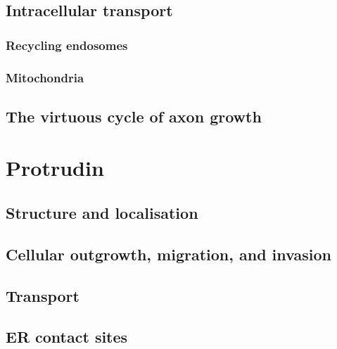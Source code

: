 \documentclass[
  12pt,
  a4paper,
]{book}
\begin{document}
\hypertarget{intracellular-transport}{%
\subsection{Intracellular transport}\label{intracellular-transport}}

\hypertarget{recycling-endosomes}{%
\subsubsection{Recycling endosomes}\label{recycling-endosomes}}

\hypertarget{mitochondria}{%
\subsubsection{Mitochondria}\label{mitochondria}}

\hypertarget{the-virtuous-cycle-of-axon-growth}{%
\subsection{The virtuous cycle of axon growth}\label{the-virtuous-cycle-of-axon-growth}}

\hypertarget{intro-ptdn}{%
\section{Protrudin}\label{intro-ptdn}}

\hypertarget{structure-and-localisation}{%
\subsection{Structure and localisation}\label{structure-and-localisation}}

\hypertarget{cellular-outgrowth-migration-and-invasion}{%
\subsection{Cellular outgrowth, migration, and invasion}\label{cellular-outgrowth-migration-and-invasion}}

\hypertarget{intro-ptdn-transport}{%
\subsection{Transport}\label{intro-ptdn-transport}}

\hypertarget{er-contact-sites}{%
\subsection{ER contact sites}\label{er-contact-sites}}
\end{document}
